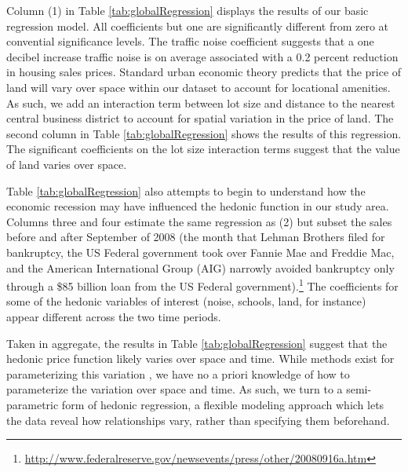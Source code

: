 \documentclass{article}\usepackage{graphicx, color}
\begin{document}
Column (1) in Table \ref{tab:globalRegression} displays the results of our basic regression model. All coefficients but one are significantly different from zero at convential significance levels. The traffic noise coefficient suggests that a one decibel increase traffic noise is on average associated with a 0.2 percent reduction in housing sales prices. Standard urban economic theory \citep{Alonso1964, Mills1967, Muth1969} predicts that the price of land will vary over space within our dataset to account for locational amenities. As such, we add an interaction term between lot size and distance to the nearest central business district to account for spatial variation in the price of land. The second column in Table \ref{tab:globalRegression} shows the results of this regression. The significant coefficients on the lot size interaction terms suggest that the value of land varies over space. 

Table \ref{tab:globalRegression} also attempts to begin to understand how the economic recession may have influenced the hedonic function in our study area. Columns three and four estimate the same regression as (2) but subset the sales before and after September of 2008 (the month that Lehman Brothers filed for bankruptcy, the US Federal government took over Fannie Mae and Freddie Mac, and the American International Group (AIG) narrowly avoided bankruptcy only through a \$85 billion loan from the US Federal government).\footnote{\url{http://www.federalreserve.gov/newsevents/press/other/20080916a.htm}} The coefficients for some of the hedonic variables of interest (noise, schools, land, for instance) appear different across the two time periods.

Taken in aggregate, the results in Table \ref{tab:globalRegression} suggest that the hedonic price function likely varies over space and time. While methods exist for parameterizing this variation \citep[such as spatial expansion as suggested by][]{Casetti1972}, we have no a priori knowledge of how to parameterize the variation over space and time. As such, we turn to a semi-parametric form of hedonic regression, a flexible modeling approach which lets the data reveal how relationships vary, rather than specifying them beforehand.
\end{document}
